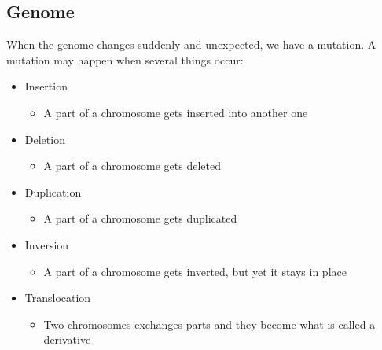 \documentclass[UKenglish,11pt,a4paper]{article}
\begin{document}
\subsection*{Genome}
When the genome changes suddenly and unexpected, we have a mutation. A mutation may happen when several things occur:
\begin{itemize}
    \item Insertion
        \begin{itemize}
            \item A part of a chromosome gets inserted into another one
        \end{itemize}
    \item Deletion
        \begin{itemize}
            \item A part of a chromosome gets deleted
        \end{itemize}
    \item Duplication
        \begin{itemize}
            \item A part of a chromosome gets duplicated
        \end{itemize}
    \item Inversion
        \begin{itemize}
            \item A part of a chromosome gets inverted, but yet it stays in place
        \end{itemize}
    \item Translocation
        \begin{itemize}
            \item Two chromosomes exchanges parts and they become what is called a derivative
        \end{itemize}
\end{itemize}
\printbibliography
\end{document}
